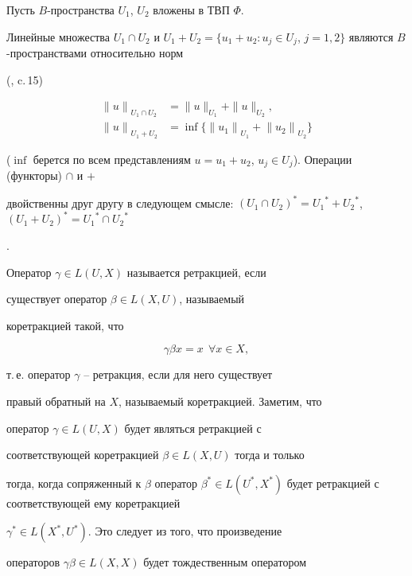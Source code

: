 Пусть $B$-пространства $U_1$, $U_2$ вложены в ТВП $\Phi$.


Линейные множества $U_1 \cap U_2$ и $U_1+U_2=\{u_1+u_2 : u_j


\in U_j$, $j=1,2 \}$ являются $B$-пространствами относительно норм


(\cite{Trib}, c.\,15)


\begin{align*}


{\|u\|}_{U_1 \cap U_2}&=\|u\|_{U_1}+\|u\|_{U_2}, \\


%


{\|u\|}_{U_1+U_2}&=\inf \{ {\|u_1 \|}_{U_1}+{\|u_2


\|}_{U_2} \}


\end{align*}


($\inf$ берется по всем представлениям $u=u_1+u_2$, $u_j


\in U_j$). Операции (функторы) $\cap$ и $+$


двойственны друг другу в следующем смысле: $(U_1 \cap U_2)^* =


{U_1}^*+{U_2}^*$, $(U_1 +U_2)^*={U_1}^* \cap {U_2}^*$


\cite{Aron}.





Оператор $\gamma \in L(U, X)$ называется ретракцией, если


существует оператор $\beta \in L(X, U)$, называемый


коретракцией такой, что


$$


\gamma \beta x=x \ \ \forall x \in X,


$$


т.\,е. оператор $\gamma$ -- ретракция, если для него существует


правый обратный на $X$, называемый коретракцией. Заметим, что


оператор $\gamma \in L(U, X)$ будет являться ретракцией с


соответствующей коретракцией $\beta \in L(X, U)$ тогда и только


тогда, когда сопряженный к $\beta$ оператор $\beta^* \in L(U^*,


X^*)$ будет ретракцией с соответствующей ему коретракцией


$\gamma^* \in L(X^*, U^*)$. Это следует из того, что произведение


операторов $\gamma\beta \in L(X,X)$ будет тождественным оператором


